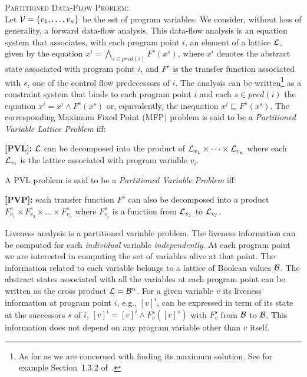 \begin{definition}
\label{pro:pvp}
\textsc{Partitioned Data-Flow Problem}:\\Let ${\cal V}=\{v_1,\dots,v_n\}$ be the set of program variables.
We consider, without loss of generality, a forward data-flow analysis.
This data-flow analysis is an equation system that associates, with each program point $i$, an element of a lattice ${\cal L}$, given by the equation $x^i = \bigwedge_{s \in \mathit{pred}(i)} F^s(x^s)$, where $x^i$ denotes the abstract state associated  with program point $i$, and $F^s$ is the transfer function associated with $s$, one of the control flow predecessors of $i$.
The analysis can be written\footnote{As far as we are concerned with finding its maximum solution. See for example Section~1.3.2 of~\cite{Nielson05}.} as a constraint system that binds to each program point $i$ and each $s\in \mathit{pred}(i)$ the equation $x^i = x^i \wedge  F^s(x^s)$ or, equivalently, the inequation $x^i \sqsubseteq  F^s(x^s)$.
The corresponding Maximum Fixed Point (MFP) problem is said to be a \emph{Partitioned Variable Lattice Problem} iff:
\begin{description}
\item {\bf [PVL]:} $\cal L$ can be decomposed into the product of ${\cal L}_{v_1}\times \dots \times {\cal L}_{v_n}$ where each ${\cal L}_{v_i}$ is the lattice associated with program variable $v_i$.
\end{description}
A PVL problem is said to be a \emph{Partitioned Variable Problem} iff:
\begin{description}
\item {\bf [PVP]:} each transfer function $F^s$ can also be decomposed into a product $F_{v_1}^s\times F_{v_2}^s \times \dots \times F_{v_n}^s$ where $F_{v_j}^s$ is a function from ${\cal L}_{v_j}$ to ${\cal L}_{v_j}$.
\end{description}
\end{definition}

Liveness analysis is a partitioned variable problem. 
The liveness information can be computed for each \emph{individual} variable \emph{independently}. 
At each program point we are interested in computing the set of variables alive at that point.
The information related to each variable belongs to a lattice of Boolean values ${\cal B}$.
The abstract states associated with all the variables at each program point can be written as the cross product ${\cal L}={\cal B}^n$.
For a given variable $v$ its liveness information at program point $i$, e.g., $[v]^i$, can be expressed in term of its state at the successors $s$ of $i$,
$[v]^i = [v]^i \wedge F_v^s([v]^s)$ with $F_v^s$ from $\cal B$ to $\cal B$.
This information does not depend on any program variable other than $v$ itself.

